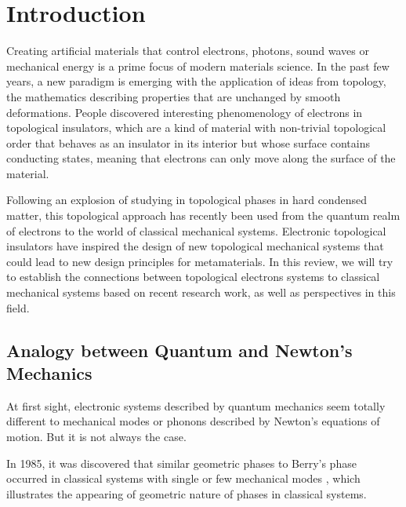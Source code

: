 \documentclass[aps,pre,preprint,groupedaddress]{revtex4-1}
\begin{document}
\section{Introduction}
Creating artificial materials that control electrons, photons, sound waves or mechanical energy is a prime focus of modern materials science. In the past few years, a new paradigm is emerging with the application of ideas from topology, the mathematics describing properties that are unchanged by smooth deformations. People discovered interesting phenomenology of electrons in topological insulators, which are a kind of material with non-trivial topological order that behaves as an insulator in its interior but whose surface contains conducting states, meaning that electrons can only move along the surface of the material\cite{cite-key1,cite-key2,cite-key3}.

Following an explosion of studying in topological phases in hard condensed matter, this topological approach has recently been used from the quantum realm of electrons to the world of classical mechanical systems.  Electronic topological insulators have inspired the design of new topological mechanical systems that could lead to new design principles for metamaterials\cite{huber2016topological}. In this review, we will try to establish the connections between topological electrons systems to classical mechanical systems based on recent research work, as well as perspectives in this field.

\subsection{Analogy between Quantum and Newton's Mechanics}

At first sight, electronic systems described by quantum mechanics seem totally different to mechanical modes or phonons described by Newton's equations of motion. But it is not always the case.

In 1985, it was discovered that similar geometric phases to Berry's phase \cite{cite-key5} occurred in classical systems with single or few mechanical modes \cite{cite-key9}, which illustrates the appearing of geometric nature of phases in classical systems.
\end{document}
